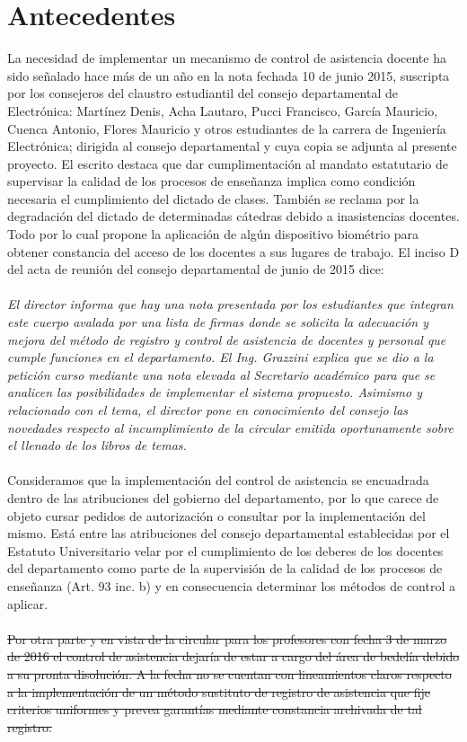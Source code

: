 \documentclass[a4paper, 11pt]{article} %
\begin{document}
\section*{Antecedentes}
La necesidad de implementar un mecanismo de control de asistencia docente ha sido señalado hace más de un año en la nota fechada 10 de junio 2015, suscripta por los consejeros del claustro estudiantil del consejo departamental de Electrónica: Martínez Denis, Acha Lautaro, Pucci Francisco, García Mauricio, Cuenca Antonio, Flores Mauricio y otros estudiantes de la carrera de Ingeniería Electrónica; dirigida al consejo departamental y cuya copia se adjunta al presente proyecto. El escrito destaca que dar cumplimentación al mandato estatutario de supervisar la calidad de los procesos de enseñanza implica como condición necesaria el cumplimiento del dictado de clases. También se reclama por  la degradación del dictado de determinadas cátedras debido a inasistencias docentes. Todo por lo cual propone la aplicación de algún dispositivo biométrio para obtener constancia del acceso de los docentes a sus lugares de trabajo.
El inciso D del acta de reunión del consejo departamental de junio de 2015 dice:\\
\\
\emph{ El director informa que hay una nota presentada por los estudiantes que integran este cuerpo avalada por una lista de firmas donde se solicita la adecuación y mejora del método de registro y control de asistencia de docentes y personal que cumple funciones en el departamento. El Ing. Grazzini explica que se dio a la petición curso mediante una nota elevada al Secretario académico para que se analicen las posibilidades de implementar el sistema propuesto. Asimismo y relacionado con el tema, el director pone en conocimiento del consejo las novedades respecto al incumplimiento de la circular emitida oportunamente sobre el llenado de los libros de temas.}\\
\\
Consideramos que la implementación del control de asistencia se encuadrada dentro de las atribuciones del gobierno del departamento, por lo que carece de objeto cursar pedidos de autorización o consultar por la implementación del mismo. Está entre las atribuciones del consejo departamental establecidas por el Estatuto Universitario velar por el cumplimiento de los deberes de los docentes del departamento como parte de la supervisión de la calidad de los procesos de enseñanza (Art. 93 inc. b) y en consecuencia determinar los métodos de control a aplicar.\\
\\
\st{Por otra parte y en vista de la circular para los profesores con fecha 3 de marzo de 2016 el control de asistencia dejaría de estar a cargo del área de bedelía debido a su pronta disolución. A la fecha  no se cuentan con lineamientos claros respecto a la implementación de un método sustituto de registro de asistencia que fije criterios uniformes y prevea garantías mediante constancia archivada de tal registro.}
\end{document}
